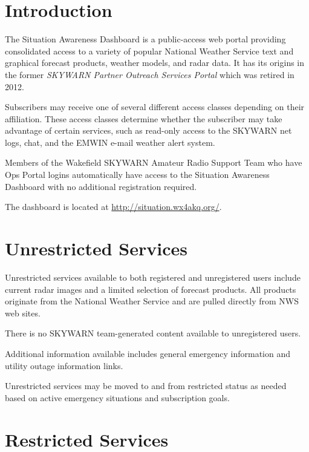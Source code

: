 \documentclass[pdflatex,letterpaper,twoside,12pt]{book}
\begin{document}
\section{Introduction}

The Situation Awareness Dashboard is a public-access web portal providing consolidated access to a variety of popular National Weather Service text and graphical forecast products, weather models, and radar data.  It has its origins in the former \emph{SKYWARN Partner Outreach Services Portal} which was retired in 2012.

Subscribers may receive one of several different access classes depending on their affiliation.  These access classes determine whether the subscriber may take advantage of certain services, such as read-only access to the SKYWARN net logs, chat, and the EMWIN e-mail weather alert system.

Members of the Wakefield SKYWARN Amateur Radio Support Team who have Ops Portal logins automatically have access to the Situation Awareness Dashboard with no additional registration required.

The dashboard is located at \url{http://situation.wx4akq.org/}.


\section{Unrestricted Services}

Unrestricted services available to both registered and unregistered users include current radar images and a limited selection of forecast products.  All products originate from the National Weather Service and are pulled directly from NWS web sites.

There is no SKYWARN team-generated content available to unregistered users.

Additional information available includes general emergency information and utility outage information links.

Unrestricted services may be moved to and from restricted status as needed based on active emergency situations and subscription goals.


\section{Restricted Services}
\end{document}
